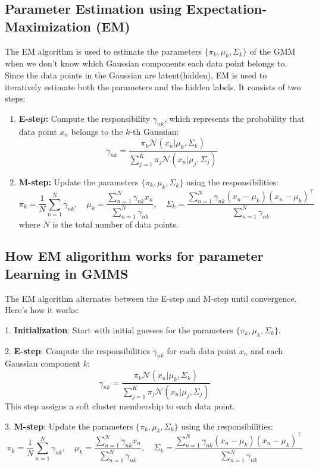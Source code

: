 \documentclass{article}
\begin{document}
\subsection*{Parameter Estimation using Expectation-Maximization (EM)}
The EM algorithm is used to estimate the parameters \(\{\pi_k, \mu_k, \Sigma_k\}\) of the GMM when we don't know which Gaussian components each data point belongs to.
Since the data points in the Gaussian are latent(hidden), EM is used to iteratively estimate both the parameters and the hidden labels. It consists of two steps:
\begin{enumerate}
    \item \textbf{E-step:} Compute the responsibility \(\gamma_{nk}\), which represents the probability that data point \(x_n\) belongs to the \(k\)-th Gaussian:
    \[
    \gamma_{nk} = \frac{\pi_k \mathcal{N}(x_n | \mu_k, \Sigma_k)}{\sum_{j=1}^{K} \pi_j \mathcal{N}(x_n | \mu_j, \Sigma_j)}
    \]
    \item \textbf{M-step:} Update the parameters \(\{\pi_k, \mu_k, \Sigma_k\}\) using the responsibilities:
    \[
    \pi_k = \frac{1}{N} \sum_{n=1}^{N} \gamma_{nk}, \quad
    \mu_k = \frac{\sum_{n=1}^{N} \gamma_{nk} x_n}{\sum_{n=1}^{N} \gamma_{nk}}, \quad
    \Sigma_k = \frac{\sum_{n=1}^{N} \gamma_{nk} (x_n - \mu_k)(x_n - \mu_k)^\top}{\sum_{n=1}^{N} \gamma_{nk}}
    \]
    where \(N\) is the total number of data points.
\end{enumerate}

\subsection*{How EM aligorithm works for parameter Learning in GMMS}
The EM algorithm alternates between the E-step and M-step until convergence. Here's how it works:

1. \textbf{Initialization}: Start with initial guesses for the parameters \(\{\pi_k, \mu_k, \Sigma_k\}\).

2. \textbf{E-step}: Compute the responsibilities \(\gamma_{nk}\) for each data point \(x_n\) and each Gaussian component \(k\):
    \[
    \gamma_{nk} = \frac{\pi_k \mathcal{N}(x_n | \mu_k, \Sigma_k)}{\sum_{j=1}^{K} \pi_j \mathcal{N}(x_n | \mu_j, \Sigma_j)}
    \]
    This step assigns a soft cluster membership to each data point.

3. \textbf{M-step}: Update the parameters \(\{\pi_k, \mu_k, \Sigma_k\}\) using the responsibilities:
    \[
    \pi_k = \frac{1}{N} \sum_{n=1}^{N} \gamma_{nk}, \quad
    \mu_k = \frac{\sum_{n=1}^{N} \gamma_{nk} x_n}{\sum_{n=1}^{N} \gamma_{nk}}, \quad
    \Sigma_k = \frac{\sum_{n=1}^{N} \gamma_{nk} (x_n - \mu_k)(x_n - \mu_k)^\top}{\sum_{n=1}^{N} \gamma_{nk}}
    \]
\end{document}
